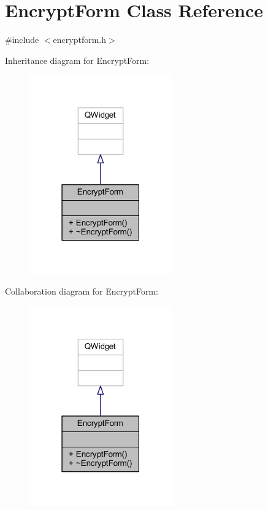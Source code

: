 \hypertarget{class_encrypt_form}{}\section{Encrypt\+Form Class Reference}
\label{class_encrypt_form}


{\ttfamily \#include $<$encryptform.\+h$>$}



Inheritance diagram for Encrypt\+Form\+:
\nopagebreak
\begin{figure}[H]
\begin{center}
\leavevmode
\includegraphics[width=174pt]{class_encrypt_form__inherit__graph}
\end{center}
\end{figure}


Collaboration diagram for Encrypt\+Form\+:
\nopagebreak
\begin{figure}[H]
\begin{center}
\leavevmode
\includegraphics[width=174pt]{class_encrypt_form__coll__graph}
\end{center}
\end{figure}
